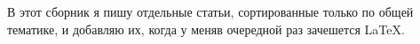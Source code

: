 
В этот сборник я пишу отдельные статьи, сортированные только по общей тематике,
и добавляю их, когда у меняв очередной раз зачешется \LaTeX.
